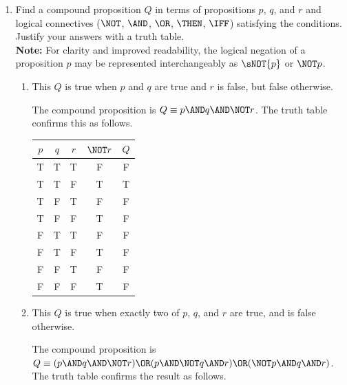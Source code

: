 \begin{enumerate}
  \newpage

















  \item Find a compound proposition $Q$ in terms of propositions $p$, $q$, 
  and $r$ and logical connectives ($\NOT$, $\AND$, $\OR$, $\THEN$, $\IFF$)
  satisfying the conditions.
  Justify your answers with a truth table.\\
  {\color{redcolor}\textbf{Note:} For clarity and improved readability, 
  the logical negation of a proposition $p$ may be represented 
  interchangeably as $\sNOT{p}$ or $\NOT p$.}
  \begin{enumerate}
    \item This $Q$ is true when $p$ and $q$ are true and $r$ is false, 
    but false otherwise.
    \begin{subanswer}
      The compound proposition is $Q \equiv p \AND q \AND \NOT r$. The truth table confirms 
      this as follows.
      \begin{center}
        \begin{tabular}{|c|c|c|c|c|}
        \hline
        $p$ & $q$ & $r$ & $\NOT r$ & $Q$ \\
        \hline
        T & T & T & F & F \\
        T & T & F & T & T \\
        T & F & T & F & F \\
        T & F & F & T & F \\
        F & T & T & F & F \\
        F & T & F & T & F \\
        F & F & T & F & F \\
        F & F & F & T & F \\
        \hline
        \end{tabular}
      \end{center}
    \end{subanswer}
    \item This $Q$ is true when exactly two of $p$, $q$, and $r$ are 
    true, and is false otherwise.
    \begin{subanswer}
      The compound proposition is 
      $Q \equiv (p \AND q \AND \NOT r) \OR (p \AND \NOT q \AND r) \OR (\NOT p \AND q \AND r)$. 
      The truth table confirms the result as follows.

\end{subanswer}
\end{enumerate}
\end{enumerate}
